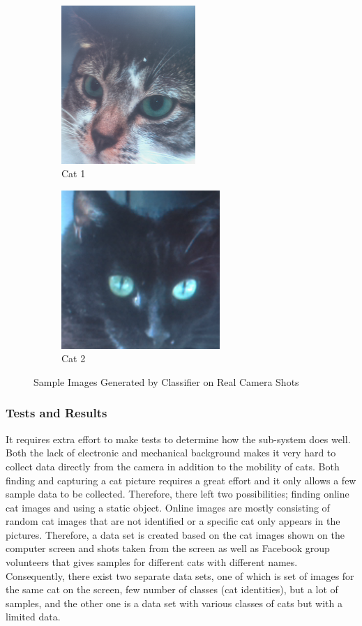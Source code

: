 \begin{figure}
    \centering
    \begin{subfigure}[t]{0.5\textwidth}
        \centering
        \includegraphics[height=6cm]{content/040_image_processing/identification/img/backgroundExtract1.png}
        \caption{Cat 1}
    \end{subfigure}%
    \begin{subfigure}[t]{0.5\textwidth}
        \centering
        \includegraphics[height=6cm]{content/040_image_processing/identification/img/backgroundExtract2.png}
        \caption{Cat 2}
    \end{subfigure}
    \caption{Sample Images Generated by Classifier on Real Camera Shots}
    \label{fig:sampleNoBackground}
\end{figure}



\subsubsection{Tests and Results}
It requires extra effort to make tests to determine how the sub-system does well. Both the lack of electronic and mechanical background makes it very hard to collect data directly from the camera in addition to the mobility of cats. Both finding and capturing a cat picture requires a great effort and it only allows a few sample data to be collected. Therefore, there left two possibilities; finding online cat images and using a static object. Online images are mostly consisting of random cat images that are not identified or a specific cat only appears in the pictures. Therefore, a data set is created based on the cat images shown on the computer screen and shots taken from the screen as well as Facebook group volunteers that gives samples for different cats with different names. Consequently, there exist two separate data sets, one of which is set of images for the same cat on the screen, few number of classes (cat identities), but a lot of samples, and the other one is a data set with various classes of cats but with a limited data.

